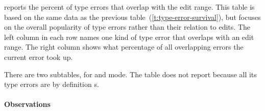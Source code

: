 \documentclass[english,submission,cleveref]{programming}
\begin{document}

 reports the percent of
type errors that overlap with the edit range.
This table is based on the same data as the previous table~(\cref{t:type-error-survival}),
but focuses on the overall popularity of type errors
rather than their relation to edits.
The left column in each row names one kind of type error
that overlaps with an edit range.
The right column shows what percentage of all overlapping
errors the current error took up.

There are two subtables, for \mnonstrict{} and \mstrict{} mode.
The table does not report \mnocheck{} because all its type errors are
by definition s.

\paragraph{Observations}
\end{document}
